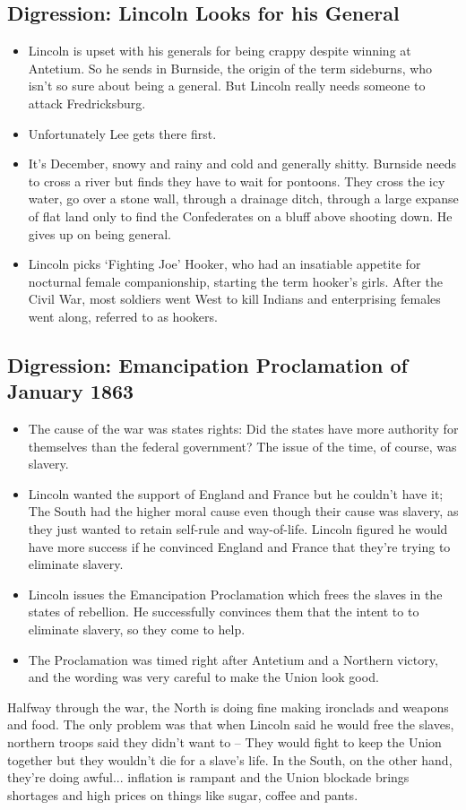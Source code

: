 \documentclass{article}
\begin{document}
  \subsection{Digression: Lincoln Looks for his General}
    \begin{itemize}
      \item Lincoln is upset with his generals for being crappy despite winning at Antetium. So he sends in Burnside, the origin of the term sideburns, who isn't so sure about being a general. But Lincoln really needs someone to attack Fredricksburg.
      \item Unfortunately Lee gets there first.
      \item It's December, snowy and rainy and cold and generally shitty. Burnside needs to cross a river but finds they have to wait for pontoons. They cross the icy water, go over a stone wall, through a drainage ditch, through a large expanse of flat land only to find the Confederates on a bluff above shooting down. He gives up on being general.
      \item Lincoln picks `Fighting Joe' Hooker, who had an insatiable appetite for nocturnal female companionship, starting the term hooker's girls. After the Civil War, most soldiers went West to kill Indians and enterprising females went along, referred to as hookers.
    \end{itemize}
  \subsection{Digression: Emancipation Proclamation of January 1863}
    \begin{itemize}
      \item The cause of the war was states rights: Did the states have more authority for themselves than the federal government? The issue of the time, of course, was slavery.
      \item Lincoln wanted the support of England and France but he couldn't have it; The South had the higher moral cause even though their cause was slavery, as they just wanted to retain self-rule and way-of-life. Lincoln figured he would have more success if he convinced England and France that they're trying to eliminate slavery.
      \item Lincoln issues the Emancipation Proclamation which frees the slaves in the states of rebellion. He successfully convinces them that the intent to to eliminate slavery, so they come to help.
      \item The Proclamation was timed right after Antetium and a Northern victory, and the wording was very careful to make the Union look good.
    \end{itemize}
  Halfway through the war, the North is doing fine making ironclads and weapons and food. The only problem was that when Lincoln said he would free the slaves, northern troops said they didn't want to -- They would fight to keep the Union together but they wouldn't die for a slave's life. In the South, on the other hand, they're doing awful... inflation is rampant and the Union blockade brings shortages and high prices on things like sugar, coffee and pants.
\end{document}
